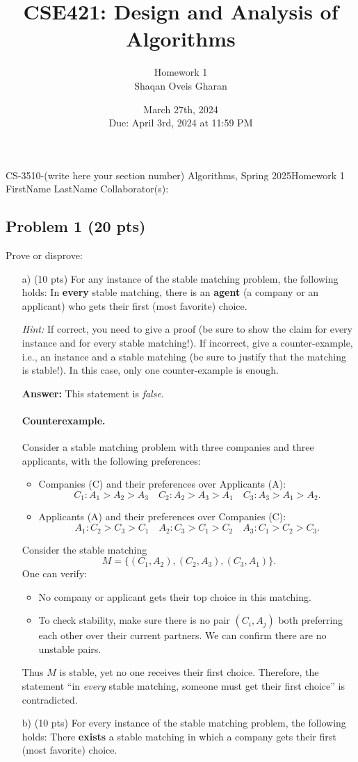 \documentclass[12pt]{article}
\title{\textbf{CSE421: Design and Analysis of Algorithms}}
\author{Homework 1 \\ Shaqan Oveis Gharan}
\date{March 27th, 2024 \\ Due: April 3rd, 2024 at 11:59 PM}
\begin{document}
\noindent CS-3510-(write here your section number) Algorithms, Spring 2025\hfill Homework 1\\
FirstName LastName \hfill Collaborator(s):

\hrulefill

\subsection*{Problem 1 (20 pts)}

Prove or disprove:

\begin{enumerate}
    \item[a)] (10 pts) For any instance of the stable matching problem, the following holds: In \textbf{every} stable matching, there is an \textbf{agent} (a company or an applicant) who gets their first (most favorite) choice. 
    
    \textit{Hint:} If correct, you need to give a proof (be sure to show the claim for every instance and for every stable matching!). If incorrect, give a counter-example, i.e., an instance and a stable matching (be sure to justify that the matching is stable!). In this case, only one counter-example is enough.

    \noindent \textbf{Answer:} 
This statement is \emph{false}.

\paragraph{Counterexample.} 
Consider a stable matching problem with three companies and three applicants, with the following preferences:

\begin{itemize}
    \item Companies (C) and their preferences over Applicants (A):
    \[
    C_1: A_1 > A_2 > A_3 \quad
    C_2: A_2 > A_3 > A_1 \quad
    C_3: A_3 > A_1 > A_2.
    \]
    \item Applicants (A) and their preferences over Companies (C):
    \[
    A_1: C_2 > C_3 > C_1 \quad
    A_2: C_3 > C_1 > C_2 \quad
    A_3: C_1 > C_2 > C_3.
    \]
\end{itemize}

Consider the stable matching 
\[
M = \bigl\{(C_1, A_2), (C_2, A_3), (C_3, A_1)\bigr\}.
\]
One can verify:
\begin{itemize}
    \item No company or applicant gets their top choice in this matching.
    \item To check stability, make sure there is no pair $(C_i, A_j)$ both preferring each other over their current partners. We can confirm there are no unstable pairs.
\end{itemize}
Thus $M$ is stable, yet no one receives their first choice. 
Therefore, the statement ``in \emph{every} stable matching, someone must get their first choice'' is contradicted.

    
    \item[b)] (10 pts) For every instance of the stable matching problem, the following holds: There \textbf{exists} a stable matching in which a company gets their first (most favorite) choice.
\end{enumerate}
\end{document}
